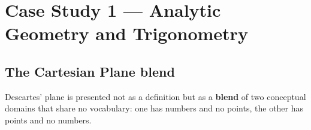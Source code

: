 \clearpage
\renewcommand{\sectioncolor}{csA}
\section{Case Study 1 — Analytic Geometry and Trigonometry}
\noindent{}\;\;

\vspace{6pt}
\subsection{The Cartesian Plane blend}

Descartes' plane is presented not as a definition but as a \textbf{blend} of two conceptual domains
that share no vocabulary: one has numbers and no points, the other has points and no numbers.

